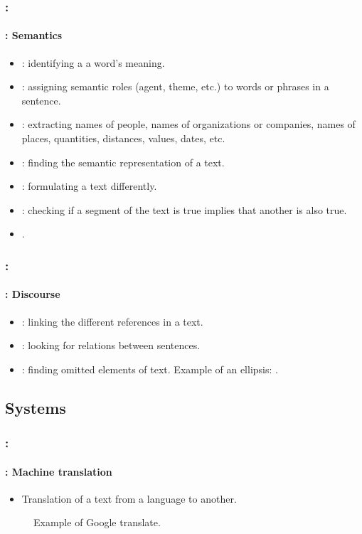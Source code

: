 \documentclass[xcolor=table]{beamer}
\begin{document}
\begin{frame}
	\frametitle{\insertshortsubtitle: \insertsection}
	\framesubtitle{\insertsubsection: Semantics}

	\begin{itemize}
		\item {}: identifying a a word's meaning.
		\item {}: assigning semantic roles (agent, theme, etc.) to words or phrases in a sentence.
		\item {}: extracting names of people, names of organizations or companies, names of places, quantities, distances, values, dates, etc.
		\item {}: finding the semantic representation of a text.
		\item {}: formulating a text differently.
		\item {}: checking if a segment of the text is true implies that another is also true.
		\item {}.
	\end{itemize}

\end{frame}

\begin{frame}
	\frametitle{\insertshortsubtitle: \insertsection}
	\framesubtitle{\insertsubsection: Discourse}

	\begin{itemize}
		\item {}: linking the different references in a text.
		\item {}: looking for relations between sentences.
		\item {}: finding omitted elements of text.
		Example of an ellipsis: .
	\end{itemize}

\end{frame}

\subsection{Systems}

\begin{frame}
	\frametitle{\insertshortsubtitle: \insertsection}
	\framesubtitle{\insertsubsection: Machine translation}

	\begin{itemize}
		\item Translation of a text from a language to another.
	\end{itemize}
	
	\begin{figure}
		\caption{Example of Google translate.}
	\end{figure}

\end{frame}
\end{document}
